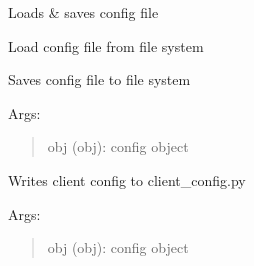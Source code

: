 \documentclass[letterpaper,10pt,english]{sphinxmanual}
\begin{document}
\begin{fulllineitems}
\label{api:pyi_updater.config.Loader}
Loads \&  saves config file

\begin{fulllineitems}
\label{api:pyi_updater.config.Loader.load_config}
Load config file from file system

\end{fulllineitems}


\begin{fulllineitems}
\label{api:pyi_updater.config.Loader.save_config}
Saves config file to file system

Args:
\begin{quote}

obj (obj): config object
\end{quote}

\end{fulllineitems}


\begin{fulllineitems}
\label{api:pyi_updater.config.Loader.write_config_py}
Writes client config to client\_config.py

Args:
\begin{quote}

obj (obj): config object
\end{quote}

\end{fulllineitems}


\end{fulllineitems}

\end{document}
